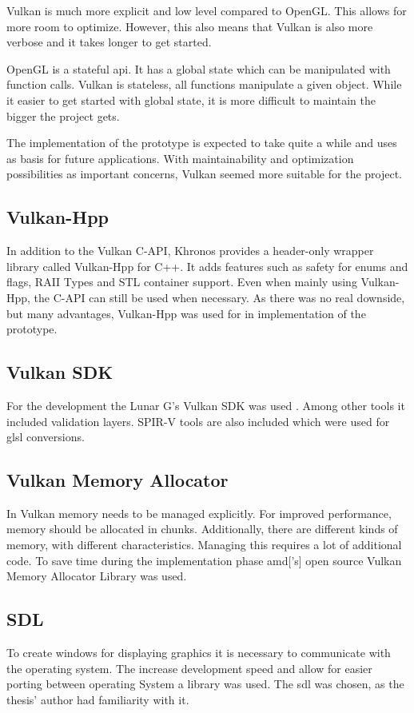 Vulkan is much more explicit and low level compared to OpenGL. This allows for more room to optimize. However, this also means that Vulkan is also more verbose and it takes longer to get started.

OpenGL is a stateful \gls{api}. It has a global state which can be manipulated with function calls. Vulkan is stateless, all functions manipulate a given object. While it easier to get started with global state, it is more difficult to maintain the bigger the project gets.

The implementation of the prototype is expected to take quite a while and uses as basis for future applications. With maintainability and optimization possibilities as important concerns, Vulkan seemed more suitable for the project. 


\subsection{Vulkan-Hpp}
In addition to the Vulkan C-API, Khronos provides a header-only wrapper library called Vulkan-Hpp for C++. It adds features such as safety for enums and flags, RAII Types and STL container support. Even when mainly using Vulkan-Hpp, the C-API can still be used when necessary. As there was no real downside, but many advantages, Vulkan-Hpp was used for in implementation of the prototype.


\subsection{Vulkan SDK}
For the development the Lunar G's Vulkan SDK was used \cite{lunarg:vulkansdk}. Among other tools it included validation layers. SPIR-V tools are also included which were used for \gls{glsl} conversions.

\subsection{Vulkan Memory Allocator}
In Vulkan memory needs to be managed explicitly. For improved performance, memory should be allocated in chunks. Additionally, there are different kinds of memory, with different characteristics. Managing this requires a lot of additional code. To save time during the implementation phase \gls{amd}['s] open source Vulkan Memory Allocator Library \cite{amd:vulkanmemoryallocator} was used.


\subsection{SDL}
To create windows for displaying graphics it is necessary to communicate with the operating system. The increase development speed and allow for easier porting between operating System a library was used. The \gls{sdl} \cite{sdl} was chosen, as the thesis' author had familiarity with it.

